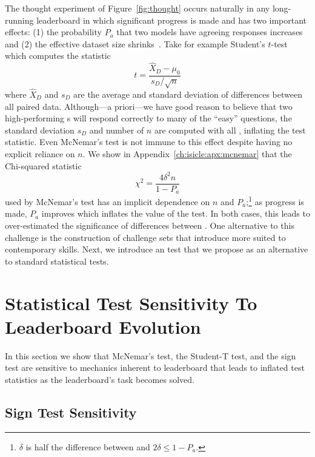 The thought experiment of Figure~\ref{fig:thought} occurs naturally in any long-running leaderboard in which significant progress is made and has two important effects: (1) the probability $P_a$ that two models have agreeing responses increases and (2) the effective dataset size shrinks~\citep{boydgraber2020nerds}.
Take for example Student's $t$-test which computes the statistic
\begin{equation*}
    t=\frac{\hat{X}_D-\mu_0}{s_D/\sqrt{n}}
\end{equation*}
where $\hat{X}_D$ and $s_D$ are the average and standard deviation of differences between all paired data.
Although---a priori---we have good reason to believe that two high-performing \subj{}s will respond correctly to many of the ``easy'' questions, the standard deviation $s_D$ and number of \itms{} $n$ are computed with all \itms{}, inflating the test statistic.
Even McNemar's test is not immune to this effect despite having no explicit reliance on $n$.
We show in Appendix~\ref{ch:isicle:apx:mcnemar} that the Chi-squared statistic
\begin{equation*}
    \chi^2=\frac{4\delta^2 n}{1-P_a}
\end{equation*}
used by McNemar's test has an implicit dependence on $n$ and $P_a$;\footnote{$\delta$ is half the difference between \subjs{} and $2\delta\le 1-P_a$.} as progress is made, $P_a$ improves which inflates the value of the test.
In both cases, this leads to over-estimated the significance of differences between \subjs{}.
One alternative to this challenge is the construction of challenge sets that introduce \itms{} more suited to contemporary \subj{} skills.
Next, we introduce an \irt{} test that we propose as an alternative to standard statistical tests.




\section{Statistical Test Sensitivity To Leaderboard Evolution}

In this section we show that McNemar's test, the Student-T test, and the sign test are sensitive to mechanics inherent to leaderboard that leads to inflated test statistics as the leaderboard's task becomes solved.

\subsection{Sign Test Sensitivity}

